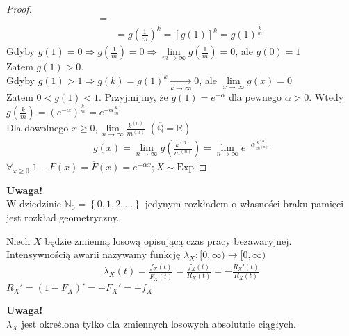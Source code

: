 \begin{twr}
\begin{proof}
\begin{align*}
=\\&=
g\left(\tfrac{1}{m}\right)^k
=
\left[g\left(1\right)\right]^k
=
g\left(1\right)^\frac{k}{m}
\end{align*}
Gdyby $ g(1)=0\Rightarrow g\left(\frac{1}{m}\right)=0\Rightarrow\lim\limits_{m\to\infty}g\left(\frac{1}{m}\right) =0 $, ale $ g(0)=1 $\\
Zatem $ g(1)>0 $.\\
Gdyby $ g(1)>1 \Rightarrow g(k)=g(1)^k\xrightarrow[k\to\infty]{} 0$, ale $ \lim\limits_{x\to\infty} g(x)=0 $\\
Zatem $ 0<g(1) <1$. Przyjmijmy, że $ g(1)=e^{-\alpha} $ dla pewnego $ \alpha>0 $. Wtedy $ g\left(\frac{k}{m}\right) =\left(e^{-\alpha}\right)^\frac{k}{m}=e^{-\alpha\frac{k}{m}}$\\
Dla dowolnego $ x\ge0,\lim\limits_{n\to\infty}\frac{k^{(n)}}{m^{(n)}}  $  $ \left(\overline{\mathbb Q}=\mathbb R \right) $
\begin{gather*}
g(x)=\lim\limits_{n\to\infty }g\left(\frac{k^{(n)}}{m^{(n)}} \right) 
=
\lim\limits_{n\to \infty } e^{-\alpha\frac{k^{(n)}}{m^{(n)}}}
\end{gather*}
$ \forall_{x\ge 0}\; 1-F(x)=\overline{F}(x)=e^{-\alpha x};X\sim \text{Exp} $
\end{proof}
\end{twr}

\textbf{Uwaga!}\\
W dziedzinie $ \mathbb N _0=\left\{0,1,2,\dots \right\} $ jedynym rozkładem o własności braku pamięci jest rozkład geometryczny.
\begin{defi}
Niech $ X $ będzie zmienną losową opisującą czas pracy bezawaryjnej. Intensywnością awarii nazywamy funkcję $ \lambda_X:[0,\infty )\to [0,\infty )$
\begin{gather*}
\lambda_X(t)
=
\frac{f_X(t)}{\overline{F}_X(t)}
=
\frac{f_X(t)}{R_X(t)}
=
-\frac{R_X'(t)}{R_X(t)}
\end{gather*}
$ R_X'=\left(1-F_X\right)'=-F_X'=-f_X $
\end{defi}

\textbf{Uwaga!}\\
$ \lambda_X $ jest określona tylko dla zmiennych losowych absolutnie ciągłych.


